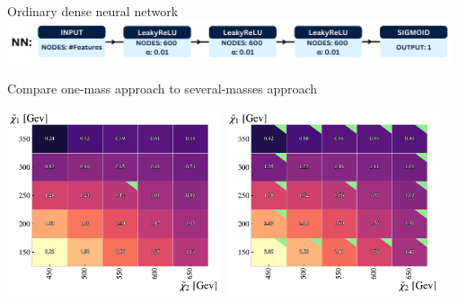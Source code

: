 \documentclass[UKenglish]{beamer}
\begin{document}

\begin{frame}{Ordinary dense neural network}
    \vfill
    \centering
    \includegraphics[width = 0.98\textwidth]{figures/NN.png}
\end{frame}
\begin{frame}{Compare one-mass approach to several-masses approach}
    \vfill
    \begin{center}
        \includegraphics[width = 0.475\textwidth]{figures/grids/NN_OneMass_InterpolationGridSig.pdf}
        \includegraphics[width = 0.475\textwidth]{figures/grids/NN_InterpolationGridSig.pdf}
    \end{center}
\end{frame}
\end{document}
